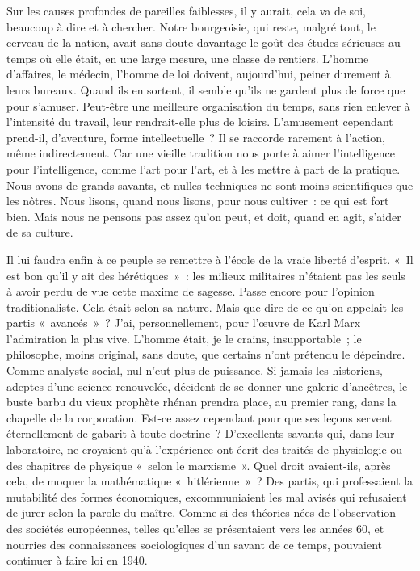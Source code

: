 \documentclass[french,twoside]{book} %
\begin{document}
Sur les causes profondes de pareilles faiblesses, il y aurait, cela va de soi, beaucoup à dire et à chercher. Notre bourgeoisie, qui reste, malgré tout, le cerveau de la nation, avait sans doute davantage le goût des études sérieuses au temps où elle était, en une large mesure, une classe de rentiers. L’homme d’affaires, le médecin, l’homme de loi doivent, aujourd’hui, peiner durement à leurs bureaux. Quand ils en sortent, il semble qu’ils ne gardent plus de force que pour s’amuser. Peut-être une meilleure organisation du temps, sans rien enlever à l’intensité du travail, leur rendrait-elle plus de loisirs. L’amusement cependant prend-il, d’aventure, forme intellectuelle ? Il se raccorde rarement à l’action, même indirectement. Car une vieille tradition nous porte à aimer l’intelligence pour l’intelligence, comme l’art pour l’art, et à les mettre à part de la pratique. Nous avons de grands savants, et nulles techniques ne sont moins scientifiques que les nôtres. Nous lisons, quand nous lisons, pour nous cultiver : ce qui est fort bien. Mais nous ne pensons pas assez   qu’on peut, et doit, quand en agit, s’aider de sa culture.\par
Il lui faudra enfin à ce peuple se remettre à l’école de la vraie liberté d’esprit. « Il est bon qu’il y ait des hérétiques » : les milieux militaires n’étaient pas les seuls à avoir perdu de vue cette maxime de sagesse. Passe encore pour l’opinion traditionaliste. Cela était selon sa nature. Mais que dire de ce qu’on appelait les partis « avancés » ? J’ai, personnellement, pour l’œuvre de Karl Marx l’admiration la plus vive. L’homme était, je le crains, insupportable ; le philosophe, moins original, sans doute, que certains n’ont prétendu le dépeindre. Comme analyste social, nul n’eut plus de puissance. Si jamais les historiens, adeptes d’une science renouvelée, décident de se donner une galerie d’ancêtres, le buste barbu du vieux prophète rhénan prendra place, au premier rang, dans la chapelle de la corporation. Est-ce assez cependant pour que ses leçons servent éternellement de gabarit à toute doctrine ? D’excellents savants qui, dans leur laboratoire, ne croyaient qu’à l’expérience ont écrit des traités de physiologie ou des chapitres de physique « selon le marxisme ». Quel droit avaient-ils, après cela, de moquer la mathématique « hitlérienne » ? Des partis, qui professaient la mutabilité des formes économiques, excommuniaient les mal avisés qui refusaient de jurer selon la parole du maître. Comme si des théories nées de l’observation des sociétés européennes, telles qu’elles se présentaient vers les années 60, et nourries des connaissances sociologiques d’un savant de ce temps, pouvaient continuer à faire loi en 1940.\par
\end{document}

